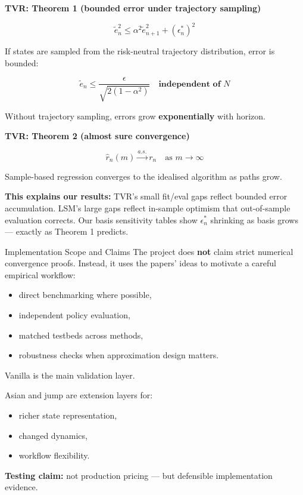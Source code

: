 \documentclass[
  11pt,
  ignorenonframetext,
  aspectratio=169,
]{beamer}
\providecommand{\tightlist}{%
  \setlength{\itemsep}{0pt}\setlength{\parskip}{0pt}}
\begin{document}
\begin{frame}{}
\label{section-4}
\textbf{TVR: Theorem 1 (bounded error under trajectory sampling)}

\[\tilde{e}_n^2 \leq \alpha^2 \tilde{e}_{n+1}^2 + (\epsilon_n^*)^2\]

If states are sampled from the risk-neutral trajectory distribution,
error is bounded:

\[\tilde{e}_n \leq \frac{\epsilon}{\sqrt{2(1-\alpha^2)}} \quad \textbf{independent of } N\]

Without trajectory sampling, errors grow \textbf{exponentially} with
horizon.
\end{frame}

\begin{frame}{}
\label{section-5}
\textbf{TVR: Theorem 2 (almost sure convergence)}

\[\hat{r}_n(m) \xrightarrow{a.s.} r_n \quad \text{as } m \to \infty\]

Sample-based regression converges to the idealised algorithm as paths
grow.

\textbf{This explains our results:} TVR's small fit/eval gaps reflect
bounded error accumulation. LSM's large gaps reflect in-sample optimism
that out-of-sample evaluation corrects. Our basis sensitivity tables
show \(\epsilon_n^*\) shrinking as basis grows --- exactly as Theorem 1
predicts.
\end{frame}

\begin{frame}{Implementation Scope and Claims}
\label{implementation-scope-and-claims}
The project does \textbf{not} claim strict numerical convergence proofs.
Instead, it uses the papers' ideas to motivate a careful empirical
workflow:

\begin{itemize}
\tightlist
\item
  direct benchmarking where possible,
\item
  independent policy evaluation,
\item
  matched testbeds across methods,
\item
  robustness checks when approximation design matters.
\end{itemize}

Vanilla is the main validation layer.

Asian and jump are extension layers for:

\begin{itemize}
\tightlist
\item
  richer state representation,
\item
  changed dynamics,
\item
  workflow flexibility.
\end{itemize}

\textbf{Testing claim:} not production pricing --- but defensible
implementation evidence.
\end{frame}
\end{document}
